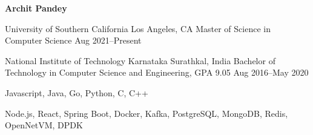 \documentclass[11pt,a4paper]{article}
\begin{document}
\begin{center}
	\textbf{\Large Archit Pandey}\\[4px]
\end{center}

\vspace{-4px}

\begin{resumesection}
\headeditem
{University of Southern California}
{Los Angeles, CA}
{Master of Science in Computer Science}
{Aug 2021--Present}

\headeditem
{National Institute of Technology Karnataka}
{Surathkal, India}
{Bachelor of Technology in Computer Science and Engineering, GPA 9.05}
{Aug 2016--May 2020}
\end{resumesection}

\begin{resumelist}
	\item Javascript, Java, Go, Python, C, C++
	\item Node.js, React, Spring Boot, Docker, Kafka, PostgreSQL, MongoDB, Redis, OpenNetVM, DPDK
\end{resumelist}
\end{document}
